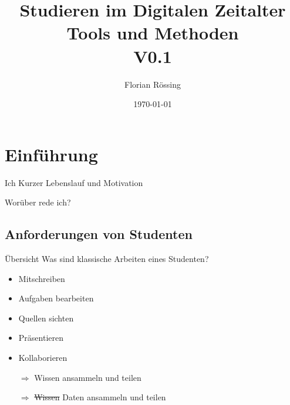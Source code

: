 \documentclass[aspectratio=169,shownotes]{beamer}
\title{Studieren im Digitalen Zeitalter \\\small Tools und Methoden\\ V0.1}
\author{Florian Rössing}
\date{\today}
\begin{document}
\maketitle

\section{Einführung}
\begin{frame}{Ich}
    Kurzer Lebenslauf und Motivation
\end{frame}

\begin{frame}{Worüber rede ich?}
\tableofcontents[sectionstyle=show,subsectionstyle=show/hide]
\end{frame}

\subsection{Anforderungen von Studenten}
\begin{frame}{Übersicht}
Was sind klassische Arbeiten eines Studenten?
    \begin{itemize}
        \item Mitschreiben
        \item Aufgaben bearbeiten
        \item Quellen sichten
        \item Präsentieren
        \item Kollaborieren     
        \item[$\Rightarrow$] Wissen ansammeln und teilen
        \item[$\Rightarrow$] \sout{Wissen} Daten ansammeln und teilen   
    \end{itemize}
\end{frame}
\end{document}
